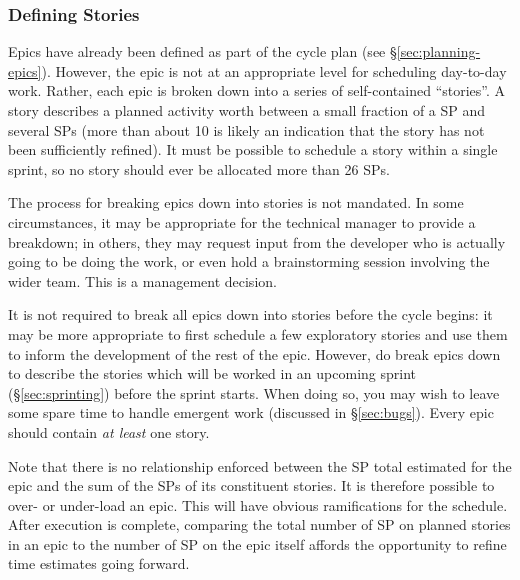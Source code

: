 \subsubsection{Defining Stories}
\label{sec:defining-stories}

Epics have already been defined as part of the \gls{cycle} plan (see \S\ref{sec:planning-epics}).
However, the \gls{epic} is not at an appropriate level for scheduling day-to-day work.
Rather, each \gls{epic} is broken down into a series of self-contained ``stories''.
A \gls{story} describes a planned activity worth between a small fraction of a SP and several \glspl{SP} (more than about 10 is likely an indication that the \gls{story} has not been sufficiently refined).
It must be possible to schedule a \gls{story} within a single sprint, so no \gls{story} should ever be allocated more than 26 \glspl{SP}.

The process for breaking \glspl{epic} down into stories is not mandated. In
some circumstances, it may be appropriate for the technical manager to
provide a breakdown; in others, they may request input from the
developer who is actually going to be doing the work, or even hold a
brainstorming session involving the wider team. This is a management
decision.

It is not required to break all \glspl{epic} down into stories before the \gls{cycle} begins: it may be more appropriate to first schedule a few exploratory stories and use them to inform the development of the rest of the \gls{epic}.
However, do break \glspl{epic} down to describe the stories which will be worked in an upcoming sprint (\S\ref{sec:sprinting}) before the sprint starts.
When doing so, you may wish to leave some spare time to handle emergent work (discussed in \S\ref{sec:bugs}).
Every epic should contain \emph{at least} one story.

Note that there is no relationship enforced between the \gls{SP} total estimated for the \gls{epic} and the sum of the \glspl{SP} of its constituent stories.
It is therefore possible to over- or under-load an \gls{epic}.
This will have obvious ramifications for the schedule.
After execution is complete, comparing the total number of SP on planned stories in an epic to the number of SP on the epic itself affords the opportunity to refine time estimates going forward. 


